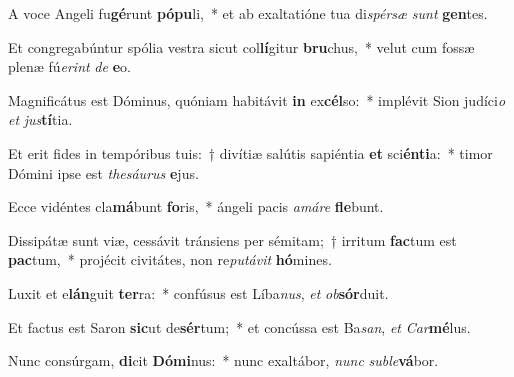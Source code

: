 \item A voce Angeli fu\textbf{gé}runt \textbf{pó}\textbf{pu}li,~* et ab exaltatióne tua di\textit{spér}\textit{sæ} \textit{sunt} \textbf{gen}tes.
\item Et congregabúntur spólia vestra sicut col\textbf{lí}gitur \textbf{bru}chus,~* velut cum fossæ plenæ fú\textit{e}\textit{rint} \textit{de} \textbf{e}o.
\item Magnificátus est Dóminus, quóniam habitávit \textbf{in} ex\textbf{cél}so:~* implévit Sion judíci\textit{o} \textit{et} \textit{jus}\textbf{tí}tia.
\item Et erit fides in tempóribus tuis:~† divítiæ salútis sapiéntia \textbf{et} sci\textbf{én}\textbf{ti}a:~* timor Dómini ipse est \textit{the}\textit{sáu}\textit{rus} \textbf{e}jus.
\item Ecce vidéntes cla\textbf{má}bunt \textbf{fo}ris,~* ángeli pacis \textit{a}\textit{má}\textit{re} \textbf{fle}bunt.
\item Dissipátæ sunt viæ, cessávit tránsiens per sémitam;~† irritum \textbf{fac}tum est \textbf{pac}tum,~* projécit civitátes, non re\textit{pu}\textit{tá}\textit{vit} \textbf{hó}mines.
\item Luxit et e\textbf{lán}guit \textbf{ter}ra:~* confúsus est Líba\textit{nus}, \textit{et} \textit{ob}\textbf{sór}duit.
\item Et factus est Saron \textbf{sic}ut de\textbf{sér}tum;~* et concússa est Ba\textit{san}, \textit{et} \textit{Car}\textbf{mé}lus.
\item Nunc consúrgam, \textbf{di}cit \textbf{Dó}\textbf{mi}nus:~* nunc exaltábor, \textit{nunc} \textit{sub}\textit{le}\textbf{vá}bor.
